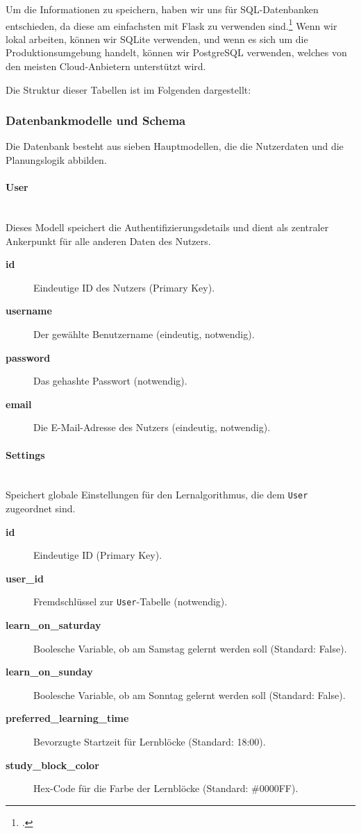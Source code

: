 \documentclass[12pt,a4paper]{report}
\newcommand{\myparagraph}[1]{\paragraph{#1}\mbox{}\\}
\begin{document}
Um die Informationen zu speichern, haben wir uns für SQL-Datenbanken entschieden, da diese am einfachsten mit Flask zu verwenden sind.\footcite{flask_database_tutorial} Wenn wir lokal arbeiten, können wir SQLite verwenden, und wenn es sich um die Produktionsumgebung handelt, können wir PostgreSQL verwenden, welches von den meisten Cloud-Anbietern unterstützt wird.

Die Struktur dieser Tabellen ist im Folgenden dargestellt:

\subsubsection{Datenbankmodelle und Schema}

Die Datenbank besteht aus sieben Hauptmodellen, die die Nutzerdaten und die Planungslogik abbilden.

\myparagraph{User}
Dieses Modell speichert die Authentifizierungsdetails und dient als zentraler Ankerpunkt für alle anderen Daten des Nutzers.
\begin{description}
    \item[\textbf{id}] Eindeutige ID des Nutzers (Primary Key).
    \item[\textbf{username}] Der gewählte Benutzername (eindeutig, notwendig).
    \item[\textbf{password}] Das gehashte Passwort (notwendig).
    \item[\textbf{email}] Die E-Mail-Adresse des Nutzers (eindeutig, notwendig).
\end{description}

\myparagraph{Settings}
Speichert globale Einstellungen für den Lernalgorithmus, die dem \texttt{User} zugeordnet sind.
\begin{description}
    \item[\textbf{id}] Eindeutige ID (Primary Key).
    \item[\textbf{user\_id}] Fremdschlüssel zur \texttt{User}-Tabelle (notwendig).
    \item[\textbf{learn\_on\_saturday}] Boolesche Variable, ob am Samstag gelernt werden soll (Standard: False).
    \item[\textbf{learn\_on\_sunday}] Boolesche Variable, ob am Sonntag gelernt werden soll (Standard: False).
    \item[\textbf{preferred\_learning\_time}] Bevorzugte Startzeit für Lernblöcke (Standard: 18:00).
    \item[\textbf{study\_block\_color}] Hex-Code für die Farbe der Lernblöcke (Standard: \#0000FF).
\end{description}
\end{document}
